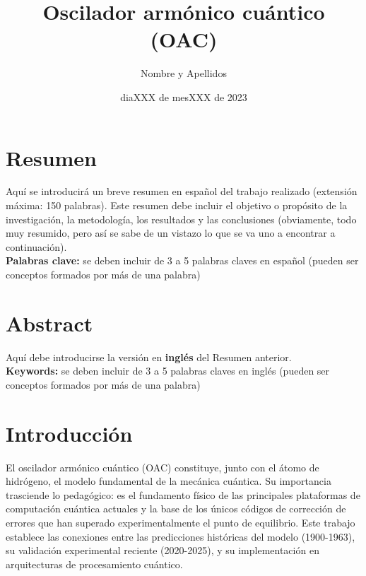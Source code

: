 \documentclass[11pt,a4paper,spanish]{book}
\title{Oscilador armónico cuántico (OAC)}
\author{Nombre y Apellidos}
\date{diaXXX de mesXXX de 2023}
\begin{document}
\renewcommand{\listfigurename}{Índice de figuras}
\renewcommand{\listtablename}{Índice de tablas}
\renewcommand{\contentsname}{Índice de contenidos}
\renewcommand{\figurename}{Figura}
\renewcommand{\tablename}{Tabla} 

\maketitle

\frontmatter
\tableofcontents
\listoffigures %
\listoftables %

\chapter{Resumen}
Aquí se introducirá un breve resumen en español del trabajo realizado (extensión máxima: 150 palabras). Este resumen debe incluir el objetivo o propósito de la investigación, la metodología, los resultados y las conclusiones (obviamente, todo muy resumido, pero así se sabe de un vistazo lo que se va uno a encontrar a continuación).\\


{\bf Palabras clave:} se deben incluir de 3 a 5 palabras claves en español (pueden ser conceptos formados por más de una palabra)

\chapter{Abstract}
Aquí debe introducirse la versión en {\bf inglés} del Resumen anterior.\\


{\bf Keywords:} se deben incluir de 3 a 5 palabras claves en inglés  (pueden ser conceptos formados por más de una palabra)




\mainmatter
\chapter{Introducción}

El oscilador armónico cuántico (OAC) constituye, junto con el átomo de hidrógeno, el modelo fundamental de la mecánica cuántica. Su importancia trasciende lo pedagógico: es el fundamento físico de las principales plataformas de computación cuántica actuales y la base de los únicos códigos de corrección de errores que han superado experimentalmente el punto de equilibrio. Este trabajo establece las conexiones entre las predicciones históricas del modelo (1900-1963), su validación experimental reciente (2020-2025), y su implementación en arquitecturas de procesamiento cuántico.
\end{document}
